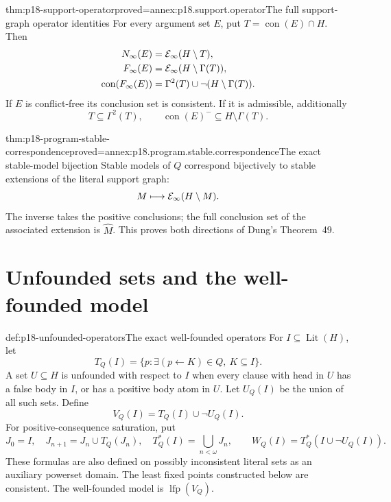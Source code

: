\begin{hblemma}{thm:p18-support-operator}{proved=annex:p18.support.operator}{The full support-graph operator identities}
For every argument set \(E\), put
\(T=\operatorname{con}(E)\cap H\). Then
\[
\begin{aligned}
 N_\infty(E)&={\cal E}_\infty(H\setminus T),\\
 F_\infty(E)&={\cal E}_\infty(H\setminus\Gamma(T)),\\
 \operatorname{con}(F_\infty(E))
             &=\Gamma^2(T)\cup\neg(H\setminus\Gamma(T)).
\end{aligned}
\]
If \(E\) is conflict-free its conclusion set is consistent.
If it is admissible, additionally
\[
 T\subseteq\Gamma^2(T),\qquad
       \operatorname{con}(E)^-\subseteq H\setminus\Gamma(T).
\]
\end{hblemma}

\begin{hbtheorem}{thm:p18-program-stable-correspondence}{proved=annex:p18.program.stable.correspondence}{The exact stable-model bijection}
Stable models of \(Q\) correspond bijectively to stable
extensions of the literal support graph:
\[
          M\longmapsto{\cal E}_\infty(H\setminus M).
\]
The inverse takes the positive conclusions; the full
conclusion set of the associated extension is \(\widehat M\).
This proves both directions of Dung's Theorem~49.
\end{hbtheorem}

\section{Unfounded sets and the well-founded model}

\begin{hbdefinition}{def:p18-unfounded-operators}{The exact well-founded operators}
For \(I\subseteq\operatorname{Lit}(H)\), let
\[
 T_Q(I)=\{p:\exists(p\leftarrow K)\in Q,\ K\subseteq I\}.
\]
A set \(U\subseteq H\) is unfounded with respect to \(I\)
when every clause with head in \(U\) has a false body in
\(I\), or has a positive body atom in \(U\).
Let \(U_Q(I)\) be the union of all such sets.
Define
\[
 V_Q(I)=T_Q(I)\cup\neg U_Q(I).
\]
For positive-consequence saturation, put
\[
 J_0=I,\quad J_{n+1}=J_n\cup T_Q(J_n),\quad
 T_Q^*(I)=\bigcup_{n<\omega}J_n,
 \qquad W_Q(I)=T_Q^*(I\cup\neg U_Q(I)).
\]
These formulas are also defined on possibly inconsistent
literal sets as an auxiliary powerset domain. The
least fixed points constructed below are consistent.
The well-founded model is \(\operatorname{lfp}(V_Q)\).
\end{hbdefinition}

